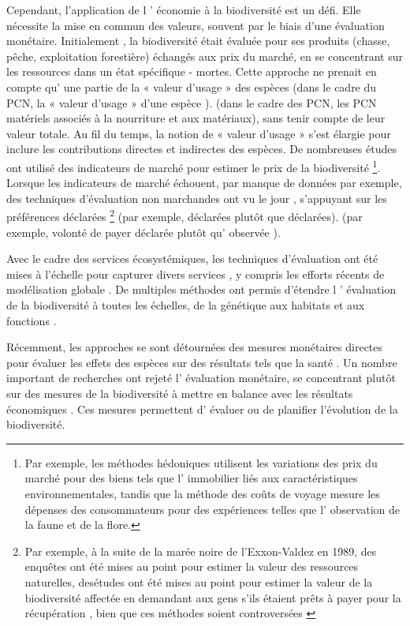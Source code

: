 \begin{displayquote}
\begin{displayquote}
\begin{displayquote}
{{{Cependant, l'application de l ' économie à la biodiversité est un défi.   Elle nécessite la mise en commun des valeurs, souvent par le biais d'une évaluation monétaire. Initialement , la biodiversité était évaluée pour ses produits (chasse, pêche, exploitation forestière) échangés aux prix du marché, en se concentrant sur les ressources dans un état spécifique - mortes. Cette approche ne prenait en compte qu' une partie de la « valeur d'usage » des espèces (dans le cadre du PCN, la « valeur d'usage » d'une espèce ). (dans le cadre des PCN, les PCN matériels associés à la nourriture et aux matériaux), sans tenir compte de leur valeur totale. Au fil du temps, la notion de « valeur d'usage » s'est élargie pour inclure les contributions directes et indirectes des espèces.   De nombreuses études ont utilisé des indicateurs de marché pour estimer le prix de la biodiversité \footnote{Par exemple, les méthodes hédoniques \citep{rosen_hedonic_1974} utilisent les variations des prix du marché pour des biens tels que l' immobilier liés aux caractéristiques environnementales, tandis que la méthode des coûts de voyage \citep{clawson_economics_1967, bhandari_willingness_2010} mesure les dépenses des consommateurs pour des expériences telles que l' observation de la faune et de la flore.}. Lorsque les indicateurs de marché échouent, par manque de données par exemple, des techniques d'évaluation non marchandes ont vu le jour \citep{carson_contingent_2012}, s'appuyant sur les préférences déclarées \footnote{Par exemple, à la suite de la marée noire de l'Exxon-Valdez en 1989, des enquêtes ont été mises au point pour estimer la valeur des ressources naturelles,     desétudes ont été mises au point pour estimer la valeur de la biodiversité affectée en demandant aux gens s'ils étaient prêts à payer pour la récupération \citep{carson_contingent_1992, arrow_report_1993, carson_contingent_2003}, bien que ces méthodes soient controversées \citep{Diamond94}} (par exemple, déclarées plutôt que déclarées). (par exemple, volonté de payer déclarée plutôt qu' observée ). 

 Avec le cadre des services écosystémiques, les techniques d'évaluation ont été mises à l'échelle pour capturer divers services \citep{Costanza1997}, y compris les efforts récents de modélisation globale \citep{giglio_economics_2024}. De multiples méthodes ont permis d'étendre l ' évaluation de la biodiversité à toutes les échelles, de la génétique aux habitats et aux fonctions \citep{bartkowski_capturing_2015}.

Récemment, les approches se sont détournées des mesures monétaires directes pour évaluer les effets des espèces sur des résultats tels que la santé \citep{frank_social_nodate,frank_economic_2024}. Un nombre important de recherches ont rejeté l' évaluation monétaire, se concentrant plutôt sur des mesures de la biodiversité à mettre en balance avec les résultats économiques \citep{Mouysset2011, Watzold2016a}.   Ces mesures permettent d' évaluer ou de planifier l'évolution de la biodiversité.


}}}
\end{displayquote}
\end{displayquote}
\end{displayquote}
